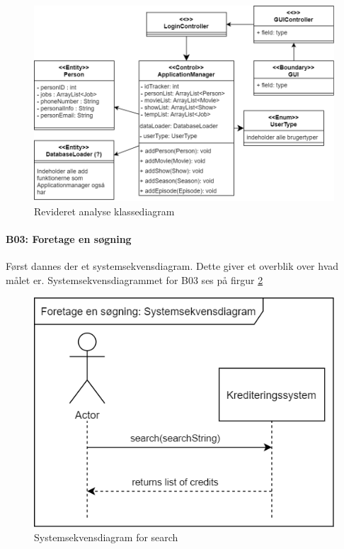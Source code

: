 \begin{figure}[H]
    \centering
    \includegraphics[scale = 0.4]{images/AnalyseKlasseDiagramV2.png}
    \caption{Revideret analyse klassediagram}
    \label{fig:AnalyseKlasseDiagramV2}
\end{figure}

\paragraph{B03: Foretage en søgning} Først dannes der et systemsekvensdiagram. Dette giver et overblik over hvad målet er. Systemsekvensdiagrammet for B03 ses på firgur \ref{fig:SystemsekvensdiagramSearch} 

\begin{figure}[H]
    \centering
\includegraphics[scale = 0.5]{images/B03SSD.png}
    \caption{Systemsekvensdiagram for search}
    \label{fig:SystemsekvensdiagramSearch}
\end{figure}

